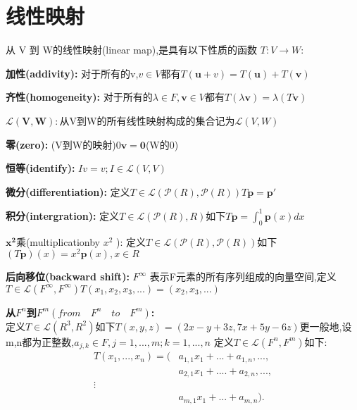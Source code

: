 \newpage
\section{线性映射}
\begin{definition}
    从 V 到 W的线性映射(linear map),是具有以下性质的函数 $T:V\to W:$
    \begin{partlist}
        \item \textbf{加性(addivity):}
对于所有的v,$v\in V$都有$T(\textbf{u}+v)=T(\textbf{u})+T(\textbf{v})$

        \item \textbf{齐性(homogeneity):}
对于所有的$\lambda \in F,\textbf{v}\in V $都有$T(\lambda\textbf{v})=\lambda(T\textbf{v})$

        \item $\mathbf{\mathcal{L}(V,W):}$从V到W的所有线性映射构成的集合记为$\mathcal{L}(V,W)$

        \item \textbf{零(zero):} (V到W的映射)$0\textbf{v}=\textbf{0}$(W的0)

        \item \textbf{恒等(identify):} $Iv=v;I\in \mathcal{L} (V,V)$

        \item \textbf{微分(differentiation):}
定义$T\in \mathcal{L}(\mathcal{P}(R),\mathcal{P}(R))$$ T\textbf{p}=\textbf{p}'$

        \item \textbf{积分(intergration):}
定义$T\in \mathcal{L}(\mathcal{P}(R),R)$如下$T\textbf{p}=\int_{0}^{1}\textbf{p}(x)dx$
        \item $\mathbf{x^2}$乘(multiplication\quad by $x^2$ ):
定义$T\in \mathcal{L}(\mathcal{P}(R),\mathcal{P}(R))$如下$(T\textbf{p})(x)=x^2\textbf{p}(x),x\in R $
        \item \textbf{后向移位(backward shift):}
        $F^\infty$ 表示F元素的所有序列组成的向量空间,定义$T\in \mathcal{L}(F^\infty,F^\infty) T(x_1,x_2,x_3,...)=(x_2,x_3,...) $
        \item {\bfseries 从$F^n$到$F^m(from \quad F^n \quad to \quad F^m)$:}\\
    
定义$T\in \mathcal{L}(R^3,R^2)$如下$T(x,y,z)=(2x-y+3z,7x+5y-6z)$更一般地,设m,n都为正整数,$a_{j,k}\in F,j=1,...,m;k=1,...,n$
定义$T\in \mathcal{L}(F^n,F^m)$如下:\\


        \begin{align*}
                        T(x_1,...,x_n)=(&a_{1,1}x_1+...+a_{1,n},...,\\ 
                                        &a_{2,1}x_1+.... +a_{2,n},...,\\
                                        \vdots \\
                                        &a_{m,1}x_1+... +a_{m,n}).   
        \end{align*}


\end{partlist}
\end{definition}

